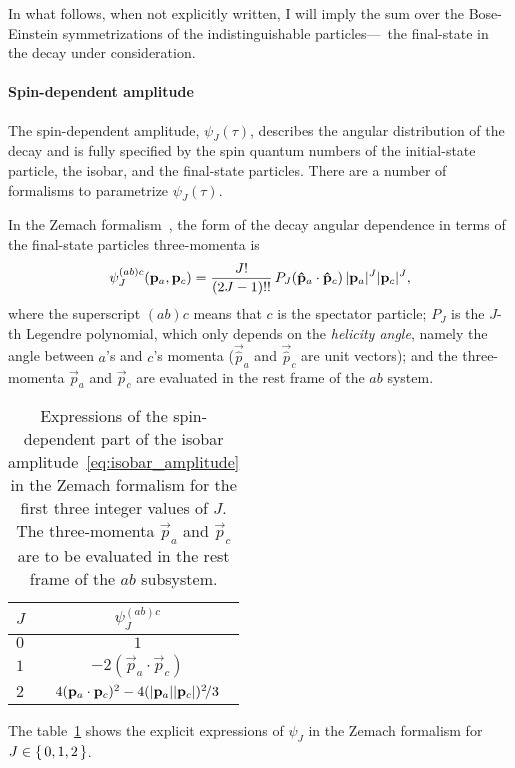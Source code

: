     In what follows, when not explicitly written, I will imply the sum over the Bose-Einstein symmetrizations of the indistinguishable particles---\ie~the final-state \Ppiplus{} in the \PDplus{} decay under consideration.


    \paragraph{Spin-dependent amplitude}
    The spin-dependent amplitude, $\psi_J(\tau)$, describes the angular distribution of the decay and is fully specified by the spin quantum numbers of the initial-state particle, the isobar, and the final-state particles.
    There are a number of formalisms to parametrize $\psi_J(\tau)$.
    

    In the Zemach formalism~\cite[\S~V.1]{PhysRev.140.B97}, the form of the decay angular dependence in terms of the final-state particles three-momenta is
    \begin{equation}\label{eq:zemach_formalism}
        \psi_{J}^{(ab)c}(\mathbf{{p}}_a,\mathbf{{p}}_c) = \frac{J!}{(2J-1)!!}\,P_J(\mathbf{{\hat{p}}}_a \cdot \mathbf{{\hat{p}}}_c)\,\lvert\mathbf{{p}}_a\rvert^J\lvert\mathbf{{p}}_c\rvert^J,
    \end{equation}
    where the superscript $(ab)c$ means that $c$ is the spectator particle;
    $P_J$ is the $J$-th Legendre polynomial, which only depends on the \emph{helicity angle}, namely the angle between $a$'s and $c$'s momenta ($\vec{\hat{p}}_a$ and $\vec{\hat{p}}_c$ are unit vectors);
    and the three-momenta $\vec{p}_a$ and $\vec{p}_c$ are evaluated in the rest frame of the $ab$ system.
    \begin{table}
        \centering
        \caption{Expressions of the spin-dependent part of the isobar amplitude~\eqref{eq:isobar_amplitude} in the Zemach formalism for the first three integer values of $J$.
                 The three-momenta $\vec{p}_a$ and $\vec{p}_c$ are to be evaluated in the rest frame of the $ab$ subsystem.}
        \label{tab:zemach_formalism}
        
        \begin{tabular}{lc}
            \toprule
            $J$ &$\psi_J^{(ab)c}$\\
            \midrule
            $0$ &$1$ \\
            $1$ &$-2(\vec{p}_a\cdot\vec{p}_c)$ \\
            $2$ &$4(\mathbf{{p}}_a\cdot\mathbf{{p}}_c)^2 - 4(\lvert\mathbf{{p}}_a\rvert\lvert\mathbf{{p}}_c\rvert)^2\!/3$\\
            \bottomrule
        \end{tabular}
    \end{table}
    The table~\ref{tab:zemach_formalism} shows the explicit expressions of $\psi_J$ in the Zemach formalism for $J\in\set{0,1,2}$.


